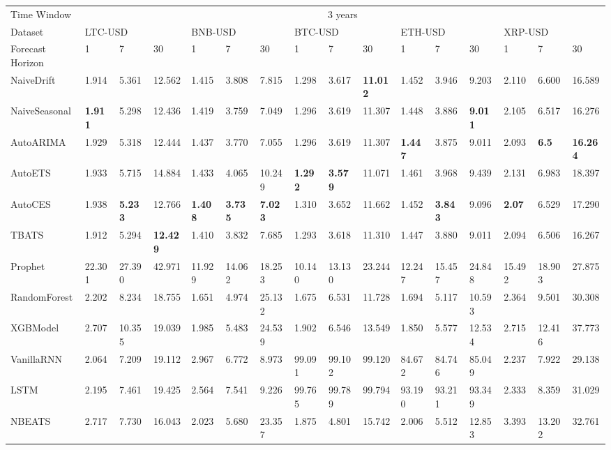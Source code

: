 \begin{tabular}{llllllllllllllll}
\toprule
Time Window & \multicolumn{15}{c}{3 years} \\
Dataset & \multicolumn{3}{l}{LTC-USD} & \multicolumn{3}{l}{BNB-USD} & \multicolumn{3}{l}{BTC-USD} & \multicolumn{3}{l}{ETH-USD} & \multicolumn{3}{l}{XRP-USD}\\
Forecast Horizon & 1 & 7 & 30 & 1 & 7 & 30 & 1 & 7 & 30 & 1 & 7 & 30 & 1 & 7 & 30 \\
\midrule
NaiveDrift & 1.914 & 5.361 & 12.562 & 1.415 & 3.808 & 7.815 & 1.298 & 3.617 & \textbf{11.012} & 1.452 & 3.946 & 9.203 & 2.110 & 6.600 & 16.589 \\
NaiveSeasonal & \textbf{1.911} & 5.298 & 12.436 & 1.419 & 3.759 & 7.049 & 1.296 & 3.619 & 11.307 & 1.448 & 3.886 & \textbf{9.011} & 2.105 & 6.517 & 16.276 \\
AutoARIMA & 1.929 & 5.318 & 12.444 & 1.437 & 3.770 & 7.055 & 1.296 & 3.619 & 11.307 & \textbf{1.447} & 3.875 & 9.011 & 2.093 & \textbf{6.5} & \textbf{16.264} \\
AutoETS & 1.933 & 5.715 & 14.884 & 1.433 & 4.065 & 10.249 & \textbf{1.292} & \textbf{3.579} & 11.071 & 1.461 & 3.968 & 9.439 & 2.131 & 6.983 & 18.397 \\
AutoCES & 1.938 & \textbf{5.233} & 12.766 & \textbf{1.408} & \textbf{3.735} & \textbf{7.023} & 1.310 & 3.652 & 11.662 & 1.452 & \textbf{3.843} & 9.096 & \textbf{2.07} & 6.529 & 17.290 \\
TBATS & 1.912 & 5.294 & \textbf{12.429} & 1.410 & 3.832 & 7.685 & 1.293 & 3.618 & 11.310 & 1.447 & 3.880 & 9.011 & 2.094 & 6.506 & 16.267 \\
Prophet & 22.301 & 27.390 & 42.971 & 11.929 & 14.062 & 18.253 & 10.140 & 13.130 & 23.244 & 12.247 & 15.457 & 24.848 & 15.492 & 18.903 & 27.875 \\
RandomForest & 2.202 & 8.234 & 18.755 & 1.651 & 4.974 & 25.132 & 1.675 & 6.531 & 11.728 & 1.694 & 5.117 & 10.593 & 2.364 & 9.501 & 30.308 \\
XGBModel & 2.707 & 10.355 & 19.039 & 1.985 & 5.483 & 24.539 & 1.902 & 6.546 & 13.549 & 1.850 & 5.577 & 12.534 & 2.715 & 12.416 & 37.773 \\
VanillaRNN & 2.064 & 7.209 & 19.112 & 2.967 & 6.772 & 8.973 & 99.091 & 99.102 & 99.120 & 84.672 & 84.746 & 85.049 & 2.237 & 7.922 & 29.138 \\
LSTM & 2.195 & 7.461 & 19.425 & 2.564 & 7.541 & 9.226 & 99.765 & 99.789 & 99.794 & 93.190 & 93.211 & 93.349 & 2.333 & 8.359 & 31.029 \\
NBEATS & 2.717 & 7.730 & 16.043 & 2.023 & 5.680 & 23.357 & 1.875 & 4.801 & 15.742 & 2.006 & 5.512 & 12.853 & 3.393 & 13.202 & 32.761 \\
\bottomrule
\end{tabular}
